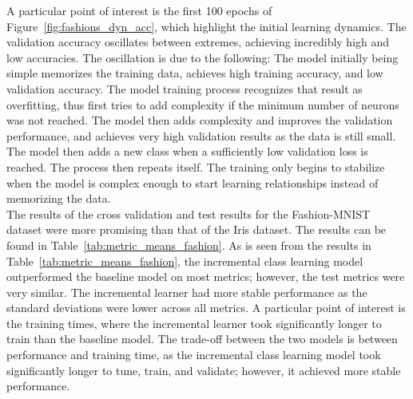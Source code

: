 \documentclass[conference]{IEEEtran}
\begin{document}
A particular point of interest is the first 100 epochs of Figure~\ref{fig:fashions_dyn_acc}, which highlight the initial learning dynamics. The validation accuracy oscillates 
between extremes, achieving incredibly high and low accuracies. The oscillation is due to the following: The model initially being simple memorizes the 
training data, achieves high training accuracy, and low validation accuracy. The model training process recognizes that result as overfitting, thus first tries 
to add complexity if the minimum number of neurons was not reached. The model then adds complexity and improves the validation performance, and achieves very high validation results as the data is still small. The model then adds 
a new class when a sufficiently low validation loss is reached. The process then repeats itself. The training only begins to stabilize when the model 
is complex enough to start learning relationships instead of memorizing the data. \\

The results of the cross validation and test results for the Fashion-MNIST dataset were more promising than that of the Iris dataset. 
The results can be found in Table~\ref{tab:metric_means_fashion}. As is seen from the results in Table~\ref{tab:metric_means_fashion}, the incremental class learning model outperformed the baseline model on most metrics; however, the 
 test metrics were very similar. The incremental learner had more stable performance as the standard deviations were lower across all metrics. A particular point 
 of interest is the training times, where the incremental learner took significantly longer to train than the baseline model. The trade-off between the two models 
 is between performance and training time, as the incremental class learning model took significantly longer to tune, train, and validate; however, it achieved more stable performance. 
\end{document}
